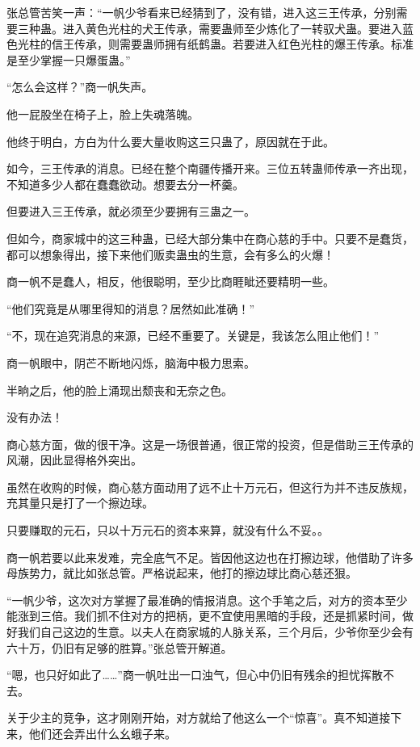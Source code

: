 \begin{this_body}
张总管苦笑一声：“一帆少爷看来已经猜到了，没有错，进入这三王传承，分别需要三种蛊。进入黄色光柱的犬王传承，需要蛊师至少炼化了一转驭犬蛊。要进入蓝色光柱的信王传承，则需要蛊师拥有纸鹤蛊。若要进入红色光柱的爆王传承。标准是至少掌握一只爆蛋蛊。”

“怎么会这样？”商一帆失声。

他一屁股坐在椅子上，脸上失魂落魄。

他终于明白，方白为什么要大量收购这三只蛊了，原因就在于此。

如今，三王传承的消息。已经在整个南疆传播开来。三位五转蛊师传承一齐出现，不知道多少人都在蠢蠢欲动。想要去分一杯羹。

但要进入三王传承，就必须至少要拥有三蛊之一。

但如今，商家城中的这三种蛊，已经大部分集中在商心慈的手中。只要不是蠢货，都可以想象得出，接下来他们贩卖蛊虫的生意，会有多么的火爆！

商一帆不是蠢人，相反，他很聪明，至少比商睚眦还要精明一些。

“他们究竟是从哪里得知的消息？居然如此准确！”

“不，现在追究消息的来源，已经不重要了。关键是，我该怎么阻止他们！”

商一帆眼中，阴芒不断地闪烁，脑海中极力思索。

半晌之后，他的脸上涌现出颓丧和无奈之色。

没有办法！

商心慈方面，做的很干净。这是一场很普通，很正常的投资，但是借助三王传承的风潮，因此显得格外突出。

虽然在收购的时候，商心慈方面动用了远不止十万元石，但这行为并不违反族规，充其量只是打了一个擦边球。

只要赚取的元石，只以十万元石的资本来算，就没有什么不妥。。

商一帆若要以此来发难，完全底气不足。皆因他这边也在打擦边球，他借助了许多母族势力，就比如张总管。严格说起来，他打的擦边球比商心慈还狠。

“一帆少爷，这次对方掌握了最准确的情报消息。这个手笔之后，对方的资本至少能涨到三倍。我们抓不住对方的把柄，更不宜使用黑暗的手段，还是抓紧时间，做好我们自己这边的生意。以夫人在商家城的人脉关系，三个月后，少爷你至少会有六十万，仍旧有足够的胜算。”张总管开解道。

“嗯，也只好如此了……”商一帆吐出一口浊气，但心中仍旧有残余的担忧挥散不去。

关于少主的竞争，这才刚刚开始，对方就给了他这么一个“惊喜”。真不知道接下来，他们还会弄出什么幺蛾子来。


\end{this_body}
